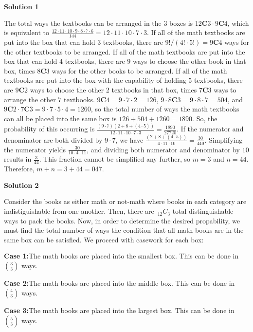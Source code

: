 \begin{enumerate}
\textbf{Solution 1}

The total ways the textbooks can be arranged in the 3 boxes is $12\textbf{C}3\cdot 9\textbf{C}4$, which is equivalent to $\frac{12\cdot 11\cdot 10\cdot 9\cdot 8\cdot 7\cdot 6}{144}=12\cdot11\cdot10\cdot7\cdot3$.   If all of the math textbooks are put into the box that can hold $3$ textbooks, there are $9!/(4!\cdot 5!)=9\textbf{C}4$ ways for the other textbooks to be arranged.  If all of the math textbooks are put into the box that can hold $4$ textbooks, there are $9$ ways to choose the other book in that box, times $8\textbf{C}3$ ways for the other books to be arranged.  If all of the math textbooks are put into the box with the capability of holding $5$ textbooks, there are $9\textbf{C}2$ ways to choose the other 2 textbooks in that box, times $7\textbf{C}3$ ways to arrange the other 7 textbooks.  $9\textbf{C}4=9\cdot7\cdot2=126$, $9\cdot 8\textbf{C}3=9\cdot8\cdot7=504$, and $9\textbf{C}2\cdot 7\textbf{C}3=9\cdot7\cdot5\cdot4=1260$, so the total number of ways the math textbooks can all be placed into the same box is $126+504+1260=1890$.  So, the probability of this occurring is $\frac{(9\cdot7)(2+8+(4\cdot5))}{12\cdot11\cdot10\cdot7\cdot3}=\frac{1890}{27720}$.  If the numerator and denominator are both divided by $9\cdot7$, we have $\frac{(2+8+(4\cdot5))}{4\cdot11\cdot10}=\frac{30}{440}$.  Simplifying the numerator yields $\frac{30}{10\cdot4\cdot11}$, and dividing both numerator and denominator by $10$ results in $\frac{3}{44}$.  This fraction cannot be simplified any further, so $m=3$ and $n=44$.  Therefore, $m+n=3+44=\boxed{047}$.

 



\textbf{Solution 2}

Consider the books as either math or not-math where books in each category are indistiguishable from one another. Then, there are $\,_{12}C_{3}$ total distinguishable ways to pack the books. Now, in order to determine the desired propability, we must find the total number of ways the condition that all math books are in the same box can be satisfied. We proceed with casework for each box:

 \textbf{Case 1:}The math books are placed into the smallest box. This can be done in $\binom{3}{3}$ ways.

 \textbf{Case 2:}The math books are placed into the middle box. This can be done in $\binom{4}{3}$ ways.

 \textbf{Case 3:}The math books are placed into the largest box. This can be done in $\binom{5}{3}$ ways.


\end{enumerate}
